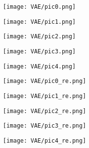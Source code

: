 \begin{figure}[t]
    \centering
    \subfigure
    {
        \begin{minipage}{0.12\linewidth}
        \texttt{[image: VAE/pic0.png]}
        \end{minipage}
    }
    \subfigure
    {
        \begin{minipage}{0.12\linewidth}
        \texttt{[image: VAE/pic1.png]}
        \end{minipage}
    }
    \subfigure
    {
        \begin{minipage}{0.12\linewidth}
        \texttt{[image: VAE/pic2.png]}
        \end{minipage}
    }
    \subfigure
    {
        \begin{minipage}{0.12\linewidth}
        \texttt{[image: VAE/pic3.png]}
        \end{minipage}
    }
    \subfigure
    {
        \begin{minipage}{0.12\linewidth}
        \texttt{[image: VAE/pic4.png]}
        \end{minipage}
    }
    \subfigure
    {
        \begin{minipage}{0.12\linewidth}
        \texttt{[image: VAE/pic0\_re.png]}
        \end{minipage}
    }
    \subfigure
    {
        \begin{minipage}{0.12\linewidth}
        \texttt{[image: VAE/pic1\_re.png]}
        \end{minipage}
    }
    \subfigure
    {
        \begin{minipage}{0.12\linewidth}
        \texttt{[image: VAE/pic2\_re.png]}
        \end{minipage}
    }
    \subfigure
    {
        \begin{minipage}{0.12\linewidth}
        \texttt{[image: VAE/pic3\_re.png]}
        \end{minipage}
    }
    \subfigure
    {
        \begin{minipage}{0.12\linewidth}
        \texttt{[image: VAE/pic4\_re.png]}
        \end{minipage}
    }
    
    \vspace{1mm}
    \hrulefill
    \vspace{1mm}
    

\end{figure}
